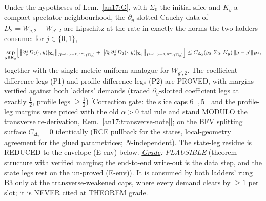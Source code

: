 \begin{lemma}[$N{=}2$ difference data at the corrected $\partial_y$-slotted
levels]\label{an17:Nc-corrected}
Under the hypotheses of Lem.~\ref{an17:G}, with $\Sigma_0$ the initial slice and
$K_y$ a compact spectator neighbourhood, the $\partial_y$-slotted Cauchy data of
$D_2=W_{g,2}-W_{g',2}$ are Lipschitz at the rate in exactly the norms the two
ladders consume: for $j\in\{0,1\}$,
\[
 \sup_{y\in K_y}\Bigl[
 \bigl\|\partial_y^{\,j}D_2(\cdot,y)|_{\Sigma_0}\bigr\|_{H^{\min(s-7,\,6^-)}(\Sigma_0)}
 +\bigl\|\partial_0\partial_y^{\,j}D_2(\cdot,y)|_{\Sigma_0}\bigr\|_{H^{\min(s-8,\,5^-)}(\Sigma_0)}
 \Bigr]\le C_{\Delta_2}(g_0,\Sigma_0,K_y)\,\|g-g'\|_{H^s},
\]
together with the single-metric uniform analogue for $W_{g',2}$. The
coefficient-difference legs (P1) and profile-difference legs (P2) are PROVED,
with margins verified against both ladders' demands (traced $\partial_y$-slotted
coefficient legs at exactly $\tfrac12$, profile legs $\ge\tfrac12$)
\textup{[Correction gate: the slice caps $6^-,5^-$ and the profile-leg margins
were priced with the old $\alpha>0$ tail rule and stand MODULO the transverse
re-derivation, Rem.~\ref{an17:transverse-note}]}; on the BFV
splitting surface $C_{\Delta_2}=0$ identically (RCE pullback for the states,
local-geometry agreement for the glued parametrices; $N$-independent). The
state-leg residue is REDUCED to the envelope \textup{(E-env)} below.
\emph{\underline{Grade}: PLAUSIBLE} (theorem-structure with verified margins;
the end-to-end write-out is the data step, and the state legs rest on the
un-proved \textup{(E-env)}). It is consumed by both ladders' rung B3 only at the
transverse-weakened caps, where every demand clears by $\ge1$ per slot; it is
NEVER cited at THEOREM grade.
\end{lemma}

